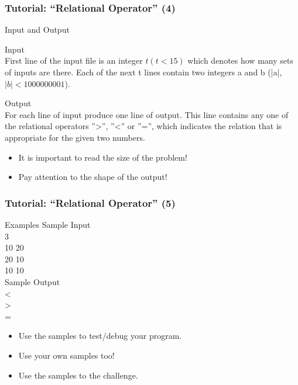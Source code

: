 \documentclass{beamer}
\begin{document}
\begin{frame}
  \frametitle{Tutorial: ``Relational Operator'' (4)}

  \begin{block}{Input and Output}
    {\smaller
    \alert{Input}\\
    First line of the input file is an integer $t (t < 15)$ which denotes how many sets of inputs are there.
    Each of the next t lines contain two integers a and b (|a|, $|b| < 1000000001$).
    \medskip

    \alert{Output}\\
    For each line of input produce one line of output. This line  contains any one of the relational operators
    ''>'', ''<'' or ''='', which indicates the relation that is appropriate for the given two numbers.
  }
  \end{block}

  \begin{itemize}
    \item It is important to read the \alert{size} of the problem!
    \item Pay attention to the \alert{shape} of the output!
  \end{itemize}

\end{frame}

\begin{frame}
  \frametitle{Tutorial: ``Relational Operator'' (5)}
  \begin{block}{Examples}
  \alert{Sample Input}\\
  3\\
  10 20\\
  20 10\\
  10 10\\
  \alert{Sample Output}\\
  <\\
  >\\
  =\\
  \end{block}

  \begin{itemize}
    \item Use the samples to test/debug your program.
    \item Use your own samples too!
    \item Use the samples to  the challenge.
  \end{itemize}
\end{frame}
\end{document}
